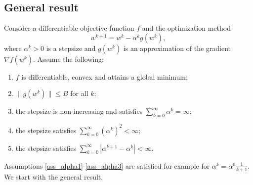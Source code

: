 \documentclass[]{interact}
\theoremstyle{plain}%
\theoremstyle{definition}
\theoremstyle{remark}
\newcommand{\norm}[1]{\|#1\|}
\newcommand{\nrm}[1]{|#1|}
\begin{document}
\subsection{General result}\label{app:sgd1}

Consider a differentiable objective function $f$ and the optimization method
\begin{equation}\label{eq:update}
w^{k+1}=w^k-\alpha^kg(w^k),
\end{equation}
where $\alpha^k>0$ is a stepsize and $g(w^k)$ is an approximation of the gradient $\nabla f(w^k)$. Assume the following:
\begin{enumerate}[label=(A\arabic*)]\itemsep 0pt
\item \label{ass_convex} $f$ is differentiable, convex and attains a global minimum;
\item \label{ass_gbound} $\norm{g(w^k)}\le B$ for all $k$;
\item \label{ass_alpha1} the stepsize is non-increasing and satisfies $\sum_{k=0}^\infty \alpha^k=\infty$;
\item \label{ass_alpha2} the stepsize satisfies $\sum_{k=0}^\infty (\alpha^k)^2<\infty$;
\item \label{ass_alpha3} the stepsize satisfies $\sum_{k=0}^\infty \nrm{\alpha^{k+1}-\alpha^k}<\infty$.
\end{enumerate}
Assumptions \ref{ass_alpha1}-\ref{ass_alpha3} are satisfied for example for $\alpha^k=\alpha^0\frac{1}{k+1}$. We start with the general result.
\end{document}
